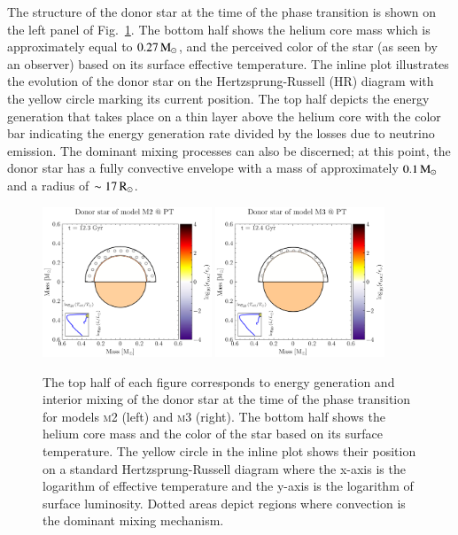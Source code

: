 \documentclass[main.tex]{subfiles}
\begin{document}
    The structure of the donor star at the time of the phase transition is shown on the left panel of Fig.~\ref{fig:donor_plots}. The bottom half shows the helium core mass which is approximately equal to $0.27\mathrm{\,M_\odot}$, and the perceived color of the star (as seen by an observer) based on its surface effective temperature. The inline plot illustrates the evolution of the donor star on the Hertzsprung-Russell (HR) diagram with the yellow circle marking its current position. The top half depicts the energy generation that takes place on a thin layer above the helium core with the color bar indicating the energy generation rate divided by the losses due to neutrino emission.
    The dominant mixing processes can also be discerned; at this point, the donor star has a fully convective envelope with a mass of approximately $0.1\mathrm{\,M_\odot}$ and a  radius of $\sim 17\mathrm{\,R_\odot}$. 
    
    \begin{figure}[th!]
        \centering
        \includegraphics[width=0.45\textwidth]{figures/chapter4/donor_m2_enegy_vs_mixing.png}
        \hspace{1cm}
        \includegraphics[width=0.45\textwidth]{figures/chapter4/donor_m3_enegy_vs_mixing.png}
        \caption{The top half of each figure corresponds to energy generation and interior mixing of the donor star at the time of the phase transition for models \textsc{m2} (left) and \textsc{m3} (right). The bottom half shows the helium core mass and the color of the star based on its surface temperature. The yellow circle in the inline plot shows their position on a standard Hertzsprung-Russell diagram where the x-axis is the logarithm of effective temperature and the y-axis is the logarithm of surface luminosity. Dotted areas depict regions where convection is the dominant mixing mechanism.}
        \label{fig:donor_plots}
    \end{figure}
    
\end{document}
